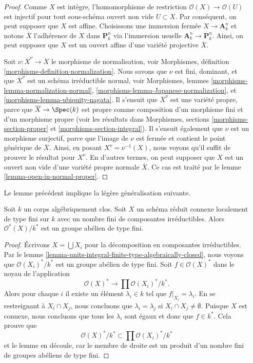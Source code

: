 \begin{proof}
 Comme $X$ est intègre, l'homomorphisme de restriction 
$\mathcal{O}(X) \to \mathcal{O}(U)$ est injectif pour tout
sous-schéma ouvert non vide $U \subset X$. Par conséquent, on peut supposer
que $X$ est affine. Choisissons une immersion fermée 
$X \to \mathbf{A}^n_k$
 et notons $\overline{X}$ l'adhérence de $X$ dans $\mathbf{P}^n_k$
 via l'immersion usuelle $\mathbf{A}^n_k \to \mathbf{P}^n_k$.
Ainsi, on peut supposer que $X$ est un ouvert affine d'une variété
projective $\overline{X}$.

\medskip\noindent
 Soit $\nu : \overline{X}^\nu \to \overline{X}$ le morphisme
de normalisation,
voir Morphismes, définition \ref{morphisms-definition-normalization}.
Nous savons que $\nu$ est fini, dominant, et que $\overline{X}^\nu$
 est un schéma irréductible normal,
voir Morphismes, lemmes \ref{morphisms-lemma-normalization-normal}, 
\ref{morphisms-lemma-Japanese-normalization}, et 
\ref{morphisms-lemma-ubiquity-nagata}.
Il s'ensuit que $\overline{X}^\nu$ est une variété propre,
parce que $\overline{X} \to \Spec(k)$ est propre comme composition d'un
morphisme fini et d'un morphisme propre (voir les
résultats dans Morphismes, sections \ref{morphisms-section-proper} et 
\ref{morphisms-section-integral}).
Il s'ensuit également que $\nu$ est un morphisme surjectif, parce que
l'image de $\nu$ est fermée et contient le point générique de $\overline{X}$.
Ainsi, en posant $X^\nu = \nu^{-1}(X)$, nous voyons qu'il suffit de prouver le
résultat pour $X^\nu$. En d'autres termes, on peut supposer que $X$ est un ouvert
non vide d'une variété propre normale $\overline{X}$. Ce cas est traité par
le lemme \ref{lemma-open-in-normal-proper}. 
\end{proof}

\noindent
 Le lemme précédent implique la légère généralisation suivante.

\begin{lemma}
\label{lemma-units-general-algebraically-closed}
 Soit $k$ un corps algébriquement clos. Soit
$X$ un schéma réduit connexe localement de type fini
sur $k$ avec un nombre fini de composantes irréductibles.
Alors $\mathcal{O}^*(X)/k^*$ est un groupe abélien de type fini. 
\end{lemma}

\begin{proof}
 Écrivons $X = \bigcup X_i$ pour la décomposition en composantes irréductibles. Par le
lemme \ref{lemma-units-integral-finite-type-algebraically-closed},
nous voyons que $\mathcal{O}(X_i)^*/k^*$ est un groupe abélien de
type fini. Soit $f \in \mathcal{O}(X)^*$ dans le noyau
de l'application 
$$
\mathcal{O}(X)^* \longrightarrow \prod \mathcal{O}(X_i)^*/k^*.
$$
 Alors pour chaque $i$ il existe un élément $\lambda_i \in k$
 tel que $f|_{X_i} = \lambda_i$.
En se restreignant à $X_i \cap X_j$, nous concluons que 
$\lambda_i = \lambda_j$ si $X_i \cap X_j \not = \emptyset$.
Puisque $X$ est connexe, nous concluons que tous les $\lambda_i$ sont
égaux et donc que $f \in k^*$. Cela prouve que 
$$
\mathcal{O}(X)^*/k^* \subset \prod \mathcal{O}(X_i)^*/k^*
$$
 et le lemme en découle, car le membre de droite est un produit d'un
nombre fini de groupes abéliens de type fini. 
\end{proof}


